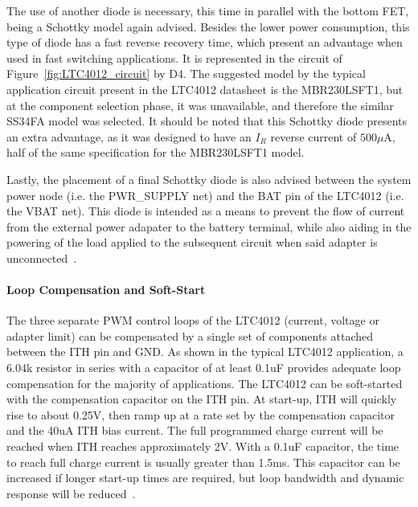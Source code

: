 The use of another diode is necessary, this time in parallel with the bottom FET, being a Schottky model again advised. Besides the lower power consumption, this type of diode has a fast reverse recovery time, which present an advantage when used in fast switching applications. It is represented in the circuit of Figure~\ref{fig:LTC4012_circuit} by D4. The suggested model by the typical application circuit present in the LTC4012 datasheet is the MBR230LSFT1, but at the component selection phase, it was unavailable, and therefore the similar SS34FA model was selected. It should be noted that this Schottky diode presents an extra advantage, as it was designed to have an $I_R$ reverse current of $500 \mu$A, half of the same specification for the MBR230LSFT1 model.

Lastly, the placement of a final Schottky diode is also advised between the system power node (i.e. the PWR\_SUPPLY net) and the BAT pin of the LTC4012 (i.e. the VBAT net). This diode is intended as a means to prevent the flow of current from the external power adapater to the battery terminal, while also aiding in the powering of the load applied to the subsequent circuit when said adapter is unconnected~\cite{LTC4012,CSD17308Q3}.

\paragraph{Loop Compensation and Soft-Start} %

The three separate PWM control loops of the LTC4012 (current, voltage or adapter limit) can be compensated by a single set of components attached between the ITH pin and GND. As shown in the typical LTC4012 application, a 6.04k resistor in series with a capacitor of at least 0.1uF provides adequate loop compensation for the majority of applications.
The LTC4012 can be soft-started with the compensation capacitor on the ITH pin. At start-up, ITH will quickly rise to about 0.25V, then ramp up at a rate set by the compensation capacitor and the 40uA ITH bias current.
The full programmed charge current will be reached when ITH reaches approximately 2V. With a 0.1uF capacitor, the time to reach full charge current is usually greater than 1.5ms.
This capacitor can be increased if longer start-up times are required, but loop bandwidth and dynamic response will be reduced~\cite{LTC4012}.


